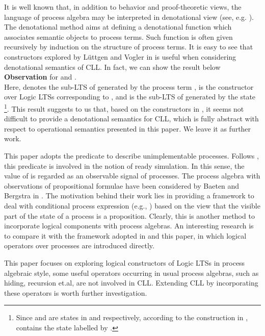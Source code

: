 \documentclass{elsarticle}
\theoremstyle{plain}
\theoremstyle{definition}
\begin{document}
It is well known that, in addition to behavior and proof-theoretic views, the language of process algebra may be interpreted in denotational view (see, e.g. \cite{Hennessy88}).
The denotational method aims at defining a denotational function which associates semantic objects to process terms.
Such function is often given recursively by induction on the structure of process terms.
It is easy to see that constructors explored by L{\"u}ttgen and Vogler in \cite{Luttgen10} is useful when considering denotational semantics of CLL.
In fact, we can show the result below\\

\noindent \textbf{Observation}  for  and .\\

Here,  denotes the sub-LTS of  generated by the process term ,  is the constructor over Logic LTSs corresponding to , and  is the sub-LTS of  generated by the state \footnote{Since  and  are states in  and  respectively, according to the construction in \cite{Luttgen10},  contains the state labelled by .}.
This result suggests to us that, based on the constructors in \cite{Luttgen10}, it seems not difficult to provide a denotational semantics for CLL, which is fully abstract with respect to operational semantics presented in this paper.
We leave it as further work.

This paper adopts the predicate  to describe unimplementable processes.
Follows \cite{Luttgen10}, this predicate is involved in the notion of ready simulation.
In this sense, the value of  is regarded as an observable signal of processes.
The process algebra with observations of propositional formulae have been considered by Baeten and Bergstra in \cite{Baeten97}.
The motivation behind their work lies in providing a framework to deal with conditional process expression (e.g., ) based on the view that the visible part of the state of a process is a proposition.
Clearly, this is another method to incorporate logical components with process algebras.
An interesting research is to compare it with the framework adopted in \cite{Luttgen10} and this paper, in which logical operators over processes are introduced directly.

This paper focuses on exploring logical constructors of Logic LTSs in process algebraic style, some useful operators occurring in usual process algebras, such as hiding, recursion et.al, are not involved in  CLL.
Extending CLL by incorporating these operators is worth further investigation.\\
\end{document}
